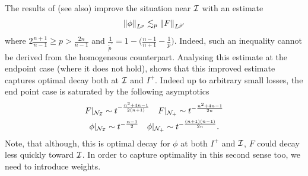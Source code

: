 \documentclass[11pt, oneside]{amsart}
\begin{document}
	The results of \cite{harmse_lebesgue_1990} (see \cite{foschi_inhomogeneous_2005} also) improve the situation near $\mathcal{I}$ with an estimate
	\begin{equation*}
		\begin{gathered}
			\left\lVert \phi\right\rVert_{L^{p}}\lesssim_p\left\lVert F\right\rVert_{L^{\tilde{p}^\prime}}
		\end{gathered}
	\end{equation*}
	where $2\frac{n+1}{n-1}\geq p>\frac{2n}{n-1}$ and $\frac{1}{\tilde{p}^\prime}=1-\big(\frac{n-1}{n+1}-\frac{1}{p}\big)$. Indeed, such an inequality cannot be derived from the homogeneous counterpart. Analysing this estimate at the endpoint case (where it does not hold), shows that this improved estimate captures optimal decay both at $\mathcal{I}$ and $I^+$. Indeed up to arbitrary small losses, the end point case is saturated by the following asymptotics
	\begin{equation*}
		\begin{gathered}
			F|_{\mathcal{N}_{\mathcal{I}}}\sim t^{-\frac{n^2+4n-1}{2(n+1)}}\quad F|_{\mathcal{N}_+}\sim t^{-\frac{n^2+4n-1}{2n}}\\
			\phi|_{\mathcal{N}_{\mathcal{I}}}\sim t^{-\frac{n-1}{2}}\quad \phi|_{\mathcal{N}_+}\sim t^{-\frac{(n+1)(n-1)}{2n}}.\\	
		\end{gathered}
	\end{equation*}
	Note, that although, this is optimal decay for $\phi$ at both $I^+$ and $\mathcal{I}$, $F$ could decay less quickly toward $\mathcal{I}$. In order to capture optimality in this second sense too, we need to introduce weights.
	
\end{document}
